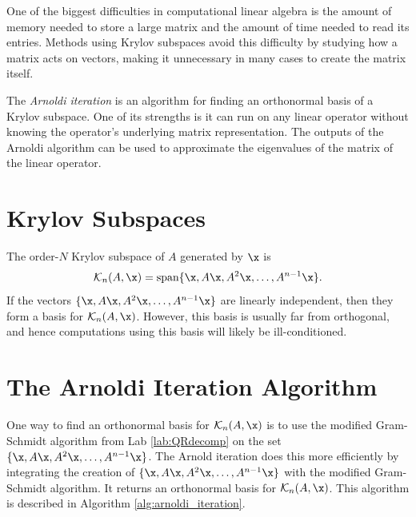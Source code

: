\label{lab:kry_arnoldi}


One of the biggest difficulties in computational linear algebra is the amount of memory needed to store a large matrix and the amount of time needed to read its entries.
Methods using Krylov subspaces avoid this difficulty by studying how a matrix acts on vectors, making it unnecessary in many cases to create the matrix itself.

The \emph{Arnoldi iteration} is an algorithm for finding an orthonormal basis of a Krylov subspace.
One of its strengths is it can run on any linear operator without knowing the operator's underlying matrix representation.
The outputs of the Arnoldi algorithm can be used to approximate the eigenvalues of the matrix of the linear operator.

\section*{Krylov Subspaces} %

The order-$N$ Krylov subspace of $A$ generated by $\x$ is
\[
\mathcal{K}_n(A, \x) =\text{span} \{\x, A\x, A^2\x, \ldots, A^{n-1}\x\}.
\]
If the vectors $\{\x, A\x, A^2\x, \ldots, A^{n-1}\x\}$ are linearly independent, then they form a basis for $\mathcal{K}_n(A,\x)$.
However, this basis is usually far from orthogonal, and hence computations using this basis will likely be ill-conditioned.

\section*{The Arnoldi Iteration Algorithm} %

One way to find an orthonormal basis for $\mathcal{K}_n(A,\x)$ is to use the modified Gram-Schmidt algorithm from Lab \ref{lab:QRdecomp} on the set $\{\x, A\x, A^2\x, \ldots, A^{n-1}\x\}$.
The Arnold iteration does this more efficiently by integrating the creation of $\{\x, A\x, A^2\x, \ldots, A^{n-1}\x\}$ with the modified Gram-Schmidt algorithm. It returns an orthonormal basis for $\mathcal{K}_n(A,\x)$. This algorithm is described in Algorithm \ref{alg:arnoldi_iteration}.

